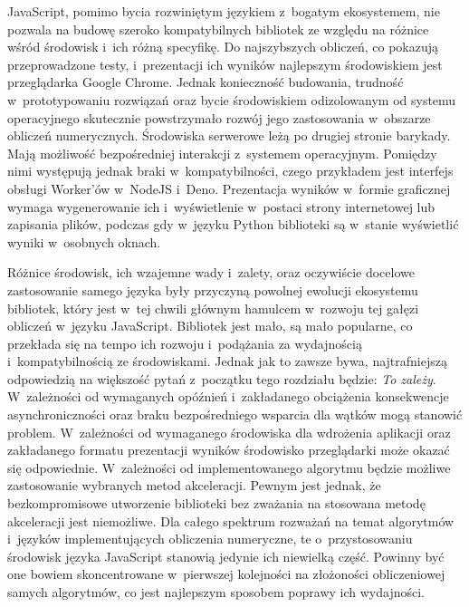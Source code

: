 JavaScript, pomimo bycia rozwiniętym językiem z~bogatym ekosystemem, nie pozwala na budowę szeroko kompatybilnych bibliotek ze względu na różnice wśród środowisk i~ich różną specyfikę. Do najszybszych obliczeń, co pokazują przeprowadzone testy, i~prezentacji ich wyników najlepszym środowiskiem jest przeglądarka Google Chrome. Jednak konieczność budowania, trudność w~prototypowaniu rozwiązań oraz bycie środowiskiem odizolowanym od systemu operacyjnego skutecznie powstrzymało rozwój jego zastosowania w~obszarze obliczeń numerycznych. Środowiska serwerowe leżą po drugiej stronie barykady. Mają możliwość bezpośredniej interakcji z~systemem operacyjnym. Pomiędzy nimi występują jednak braki w~kompatybilności, czego przykładem jest interfejs obsługi Worker'ów w~NodeJS i~Deno. Prezentacja wyników w~formie graficznej wymaga wygenerowanie ich i~wyświetlenie w~postaci strony internetowej lub zapisania plików, podczas gdy w~języku Python biblioteki są w~stanie wyświetlić wyniki w~osobnych oknach.

Różnice środowisk, ich wzajemne wady i~zalety, oraz oczywiście docelowe zastosowanie samego języka były przyczyną powolnej ewolucji ekosystemu bibliotek, który jest w~tej chwili głównym hamulcem w~rozwoju tej gałęzi obliczeń w~języku JavaScript. Bibliotek jest mało, są mało popularne, co przekłada się na tempo ich rozwoju i~podążania za wydajnością i~kompatybilnością ze środowiskami. Jednak jak to zawsze bywa, najtrafniejszą odpowiedzią na większość pytań z~początku tego rozdziału będzie: \textit{To zależy}. W~zależności od wymaganych opóźnień i~zakładanego obciążenia konsekwencje asynchroniczności oraz braku bezpośredniego wsparcia dla wątków mogą stanowić problem. W~zależności od wymaganego środowiska dla wdrożenia aplikacji oraz zakładanego formatu prezentacji wyników środowisko przeglądarki może okazać się odpowiednie. W~zależności od implementowanego algorytmu będzie możliwe zastosowanie wybranych metod akceleracji. Pewnym jest jednak, że bezkompromisowe utworzenie biblioteki bez zważania na stosowana metodę akceleracji jest niemożliwe. Dla całego spektrum rozważań na temat algorytmów i~języków implementujących obliczenia numeryczne, te o~przystosowaniu środowisk języka JavaScript stanowią jedynie ich niewielką część. Powinny być one bowiem skoncentrowane w~pierwszej kolejności na złożoności obliczeniowej samych algorytmów, co jest najlepszym sposobem poprawy ich wydajności.

\clearpage
